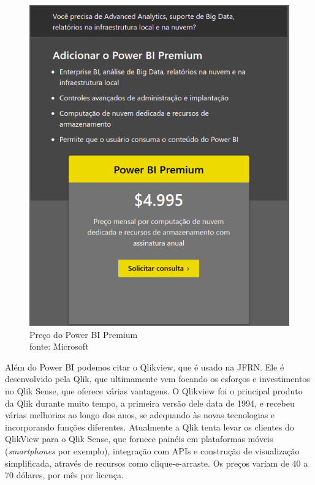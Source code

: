 \begin{figure}[h]
	\centering
	\includegraphics[scale=0.40]{./figures/cap1/powerbi.png}
	\caption{Preço do Power BI Premium \\ fonte: Microsoft}
\end{figure}


Além do Power BI podemos citar o Qlikview, que é usado na JFRN. Ele é desenvolvido pela Qlik, que ultimamente vem focando os esforços e investimentos no Qlik Sense, que oferece várias vantagens. O Qlikview foi o principal produto da Qlik durante muito tempo, a primeira versão dele data de 1994, e recebeu várias melhorias ao longo dos anos, se adequando às novas tecnologias e incorporando funções diferentes. Atualmente a Qlik tenta levar os clientes do QlikView para o Qlik Sense, que fornece painéis em plataformas móveis (\textit{smartphones} por exemplo), integração com APIs e construção de visualização simplificada, através de recursos como clique-e-arraste. Os preços variam de 40 a 70 dólares, por mês por licença.

